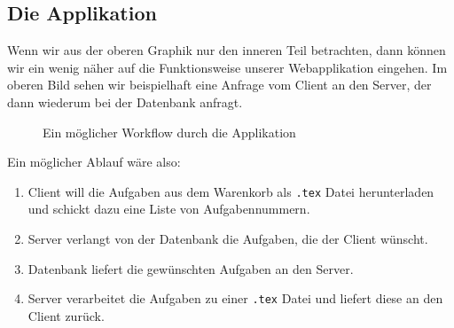 \subsection{Die Applikation}

Wenn wir aus der oberen Graphik nur den inneren Teil betrachten, dann können wir ein wenig näher auf die Funktionsweise unserer Webapplikation eingehen. Im oberen Bild sehen wir beispielhaft eine Anfrage vom Client an den Server, der dann wiederum bei der Datenbank anfragt.

\begin{figure}
    \caption{Ein möglicher Workflow durch die Applikation \cite{fig:workflow}}
\end{figure}
Ein möglicher Ablauf wäre also:
\begin{enumerate}
    \item Client will die Aufgaben aus dem Warenkorb als \verb|.tex| Datei herunterladen und schickt dazu eine Liste von Aufgabennummern.
    \item Server verlangt von der Datenbank die Aufgaben, die der Client wünscht.
    \item Datenbank liefert die gewünschten Aufgaben an den Server.
    \item Server verarbeitet die Aufgaben zu einer \verb|.tex| Datei und liefert diese an den Client zurück.
\end{enumerate}